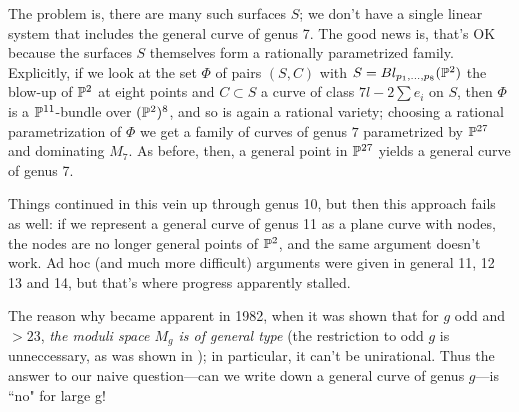 The problem is, there are many such surfaces $S$; we don't have a single linear system that includes the general curve of genus 7. The good news is, that's OK because the surfaces $S$ themselves form a rationally parametrized family. Explicitly, if we look at the set $\Phi$ of pairs $(S, C)$ with $S = Bl_{p_1,\dots,p_8}(\PP^2)$  the blow-up of $\PP^2$ at eight points and $C \subset S$ a curve of class $7l - 2 \sum e_i$ on $S$, then $\Phi$ is a $\PP^{11}$-bundle over $(\PP^2)^8$, and so is again a rational variety; choosing a rational parametrization of $\Phi$ we get a family of curves of genus $7$ parametrized by $\PP^{27}$ and dominating $M_7$. As before, then, a general point in $\PP^{27}$ yields a general curve of genus 7.

Things continued in this vein up through genus 10, but then this approach fails as well: if we represent a general curve of genus 11 as a plane curve with nodes, the nodes are no longer general points of $\PP^2$, and the same argument doesn't work. Ad hoc (and much more difficult) arguments were given in general 11, 12 13 and 14, but that's where progress apparently stalled.

The reason why became apparent in 1982, when it was shown that for $g$ odd and $>23$, \emph{the moduli space $M_g$ is of general type} (the restriction to odd $g$ is unneccessary, as was shown in ); in particular, it can't be unirational. Thus the answer to our naive question---can we write down a general curve of genus $g$---is ``no" for large g!


